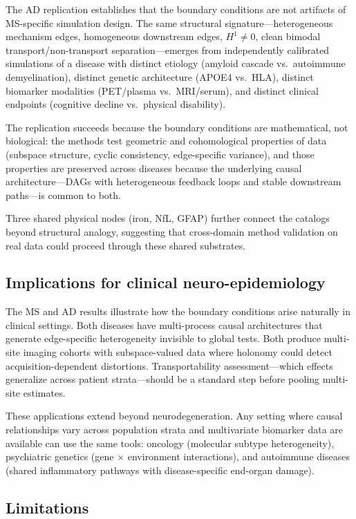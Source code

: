 \documentclass[11pt]{article}
\begin{document}
The AD replication establishes that the boundary conditions are not artifacts of MS-specific simulation design.
The same structural signature---heterogeneous mechanism edges, homogeneous downstream edges, $H^1 \neq 0$, clean bimodal transport/non-transport separation---emerges from independently calibrated simulations of a disease with distinct etiology (amyloid cascade vs.\ autoimmune demyelination), distinct genetic architecture (APOE4 vs.\ HLA), distinct biomarker modalities (PET/plasma vs.\ MRI/serum), and distinct clinical endpoints (cognitive decline vs.\ physical disability).

The replication succeeds because the boundary conditions are mathematical, not biological: the methods test geometric and cohomological properties of data (subspace structure, cyclic consistency, edge-specific variance), and those properties are preserved across diseases because the underlying causal architecture---DAGs with heterogeneous feedback loops and stable downstream paths---is common to both.

Three shared physical nodes (iron, NfL, GFAP) further connect the catalogs beyond structural analogy, suggesting that cross-domain method validation on real data could proceed through these shared substrates.

\subsection{Implications for clinical neuro-epidemiology}

The MS and AD results illustrate how the boundary conditions arise naturally in clinical settings.
Both diseases have multi-process causal architectures that generate edge-specific heterogeneity invisible to global tests.
Both produce multi-site imaging cohorts with subspace-valued data where holonomy could detect acquisition-dependent distortions.
Transportability assessment---which effects generalize across patient strata---should be a standard step before pooling multi-site estimates.

These applications extend beyond neurodegeneration.
Any setting where causal relationships vary across population strata and multivariate biomarker data are available can use the same tools: oncology (molecular subtype heterogeneity), psychiatric genetics (gene $\times$ environment interactions), and autoimmune diseases (shared inflammatory pathways with disease-specific end-organ damage).

\subsection{Limitations}
\end{document}
